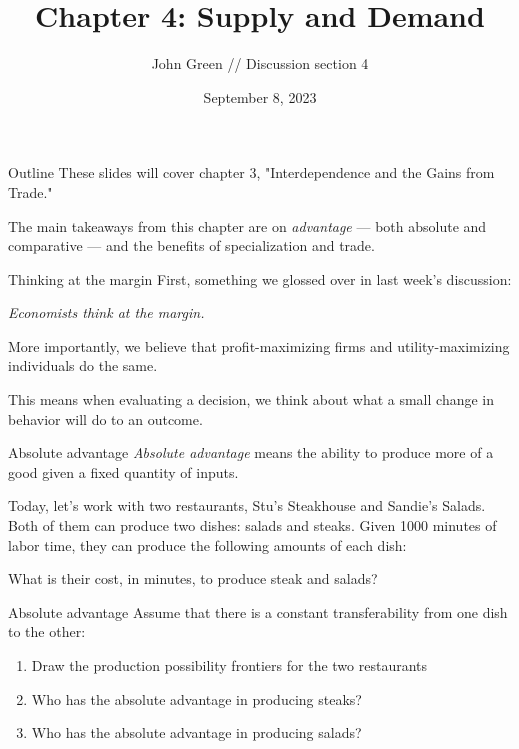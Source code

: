 \documentclass[aspectratio=169]{beamer}
\title{Chapter 4: Supply and Demand}
\author{John Green //
    Discussion section 4}
\date{September 8, 2023}
\begin{document}
\begin{frame}
    \titlepage 
\end{frame}

\begin{frame}{Outline}
    These slides will cover chapter 3, "Interdependence and the Gains from Trade."

    \medskip

    The main takeaways from this chapter are on \textit{advantage} --- both absolute and comparative --- and the benefits of specialization and trade.
\end{frame}

\begin{frame}{Thinking at the margin}
    First, something we glossed over in last week's discussion:

    \begin{center}
        \textit{Economists think at the margin.}
    \end{center}

    \medskip

    More importantly, we believe that profit-maximizing firms and utility-maximizing individuals do the same.

    \medskip

    This means when evaluating a decision, we think about what a small change in behavior will do to an outcome.

\end{frame}

\begin{frame}{Absolute advantage}
    \textit{Absolute advantage} means the ability to produce more of a good given a fixed quantity of inputs.
    
    \medskip

    Today, let's work with two restaurants, Stu's Steakhouse and Sandie's Salads. Both of them can produce two dishes: salads and steaks. Given 1000 minutes of labor time, they can produce the following amounts of each dish:

    

    What is their cost, in minutes, to produce steak and salads?
\end{frame} 

\begin{frame}{Absolute advantage}
    Assume that there is a constant transferability from one dish to the other:
    \begin{enumerate}
        \item Draw the production possibility frontiers for the two restaurants
        \item Who has the absolute advantage in producing steaks?
        \item Who has the absolute advantage in producing salads?
    \end{enumerate}
\end{frame} 
\end{document}
